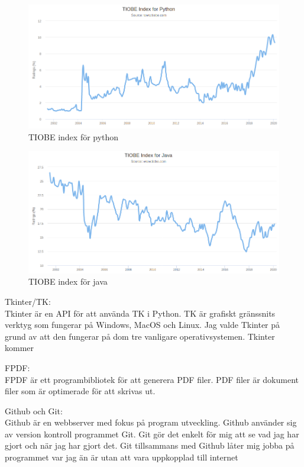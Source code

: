 \documentclass[a4paper, 12pt]{article}
\begin{document}
\begin{figure}[h!]
  \includegraphics[width=\linewidth]{img/TIOBE_python.png}
  \caption{TIOBE index för python}
  \label{fig:index_python}
\end{figure}
\begin{figure}[h!]
  \includegraphics[width=\linewidth]{img/TIOBE_java.png}
  \caption{TIOBE index för java}
  \label{fig:index_java}
\end{figure}


Tkinter/TK:\\
Tkinter är en API för att använda TK i Python. 
TK är grafiskt gränssnits verktyg som fungerar på Windows, MacOS och Linux. 
Jag valde Tkinter på grund av att den fungerar på dom tre vanligare operativsystemen.
Tkinter kommer 


FPDF:\\
FPDF är ett programbibliotek för att generera PDF filer.
PDF filer är dokument filer som är optimerade för att skrivas ut.


Github och Git:\\
Github är en webbserver med fokus på program utveckling. 
Github använder sig av version kontroll programmet Git. 
Git gör det enkelt för mig att se vad jag har gjort och när jag har gjort det.
Git tillsammans med Github låter mig jobba på programmet var jag än är utan att vara uppkopplad till internet
\end{document}
